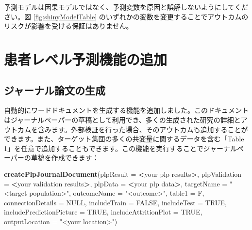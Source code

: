 \documentclass[
  11pt]{book}
\makeatletter
\newenvironment{Shaded}{\begin{snugshade}}{\end{snugshade}}
\newcommand{\AttributeTok}[1]{\textcolor[rgb]{0.13,0.29,0.53}{#1}}
\newcommand{\ConstantTok}[1]{\textcolor[rgb]{0.56,0.35,0.01}{#1}}
\newcommand{\FunctionTok}[1]{\textcolor[rgb]{0.13,0.29,0.53}{\textbf{#1}}}
\newcommand{\NormalTok}[1]{#1}
\newcommand{\SpecialCharTok}[1]{\textcolor[rgb]{0.81,0.36,0.00}{\textbf{#1}}}
\newcommand{\StringTok}[1]{\textcolor[rgb]{0.31,0.60,0.02}{#1}}
\newenvironment{kframe}{%
\medskip{}
\setlength{\fboxsep}{.8em}
 \def\at@end@of@kframe{}%
 \ifinner\ifhmode%
  \def\at@end@of@kframe{\end{minipage}}%
  \begin{minipage}{\columnwidth}%
 \fi\fi%
 \def\FrameCommand##1{\hskip\@totalleftmargin \hskip-\fboxsep
 \colorbox{myShadeColor}{##1}\hskip-\fboxsep
     \hskip-\linewidth \hskip-\@totalleftmargin \hskip\columnwidth}%
 \MakeFramed {\advance\hsize-\width
   \@totalleftmargin\z@ \linewidth\hsize
   \@setminipage}}%
 {\par\unskip\endMakeFramed%
 \at@end@of@kframe}
\newenvironment{rmdblock}[1]
  {
  \begin{itemize}
  \renewcommand{\labelitemi}{
    \raisebox{-.7\height}[0pt][0pt]{
      {\setkeys{Gin}{width=3em,keepaspectratio}\texttt{[image: images/\#1]}}
    }
  }
  \setlength{\fboxsep}{1em}
  \begin{kframe}
  \item
  }
  {
  \end{kframe}
  \end{itemize}
  }
\newenvironment{rmdimportant}
  {\begin{rmdblock}{important}}
  {\end{rmdblock}}
\theoremstyle{definition}
\theoremstyle{definition}
\theoremstyle{definition}
\theoremstyle{definition}
\theoremstyle{remark}
\makeatother
\begin{document}
\begin{rmdimportant}
予測モデルは因果モデルではなく、予測変数を原因と誤解しないようにしてください。図 \ref{fig:shinyModelTable} のいずれかの変数を変更することでアウトカムのリスクが影響を受ける保証はありません。
\end{rmdimportant}

\section{患者レベル予測機能の追加}\label{ux60a3ux8005ux30ecux30d9ux30ebux4e88ux6e2cux6a5fux80fdux306eux8ffdux52a0}

\subsection{ジャーナル論文の生成}\label{ux30b8ux30e3ux30fcux30caux30ebux8ad6ux6587ux306eux751fux6210}

自動的にワードドキュメントを生成する機能を追加しました。このドキュメントはジャーナルペーパーの草稿として利用でき、多くの生成された研究の詳細とアウトカムを含みます。外部検証を行った場合、そのアウトカムも追加することができます。また、ターゲット集団の多くの共変量に関するデータを含む「Table 1」を任意で追加することもできます。この機能を実行することでジャーナルペーパーの草稿を作成できます：

\begin{Shaded}
\begin{Highlighting}[]
 \FunctionTok{createPlpJournalDocument}\NormalTok{(}\AttributeTok{plpResult =} \SpecialCharTok{\textless{}}\NormalTok{your plp results}\SpecialCharTok{\textgreater{}}\NormalTok{,}
             \AttributeTok{plpValidation =} \SpecialCharTok{\textless{}}\NormalTok{your validation results}\SpecialCharTok{\textgreater{}}\NormalTok{,}
             \AttributeTok{plpData =} \SpecialCharTok{\textless{}}\NormalTok{your plp data}\SpecialCharTok{\textgreater{}}\NormalTok{,}
             \AttributeTok{targetName =} \StringTok{"\textless{}target population\textgreater{}"}\NormalTok{,}
             \AttributeTok{outcomeName =} \StringTok{"\textless{}outcome\textgreater{}"}\NormalTok{,}
             \AttributeTok{table1 =}\NormalTok{ F,}
             \AttributeTok{connectionDetails =} \ConstantTok{NULL}\NormalTok{,}
             \AttributeTok{includeTrain =} \ConstantTok{FALSE}\NormalTok{,}
             \AttributeTok{includeTest =} \ConstantTok{TRUE}\NormalTok{,}
             \AttributeTok{includePredictionPicture =} \ConstantTok{TRUE}\NormalTok{,}
             \AttributeTok{includeAttritionPlot =} \ConstantTok{TRUE}\NormalTok{,}
             \AttributeTok{outputLocation =} \StringTok{"\textless{}your location\textgreater{}"}\NormalTok{)}
\end{Highlighting}
\end{Shaded}
\end{document}
